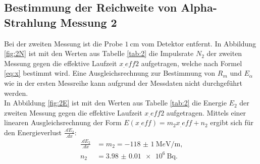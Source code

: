 \subsection{Bestimmung der Reichweite von Alpha-Strahlung Messung 2}

Bei der zweiten Messung ist die Probe $\SI{1}{\centi\metre}$ vom Detektor entfernt.
In Abbildung \ref{fig:2N} ist mit den Werten aus Tabelle \ref{tab:2} die Impulsrate $N_2$ der zweiten Messung gegen die effektive Laufzeit $x_.{eff2}$ aufgetragen, welche nach Formel \eqref{eq:x} bestimmt wird. Eine Ausgleichsrechnung zur Bestimmung von $R_m$ und $E_\alpha$ wie in der ersten Messreihe kann aufgrund der Messdaten nicht durchgeführt werden.\\
In Abbildung \ref{fig:2E} ist mit den Werten aus Tabelle \ref{tab:2} die Energie $E_2$ der zweiten Messung gegen die effektive Laufzeit $x_.{eff2}$ aufgetragen.
Mittels einer linearen Ausgleichsrechnung der Form $E(x_.{eff})=m_2 x_.{eff} +n_2$ ergibt sich für den Energieverlust $\frac{.dE_2}{.dx}$:
\begin{align*}
\frac{.dE_2}{.dx}	&= m_2 = \SI{-118(1)}{\mega e\volt\per\metre}\text{,}\\
n_2	&= \SI{3.98(1)e6}{\becquerel}\text{.}
\end{align*}

